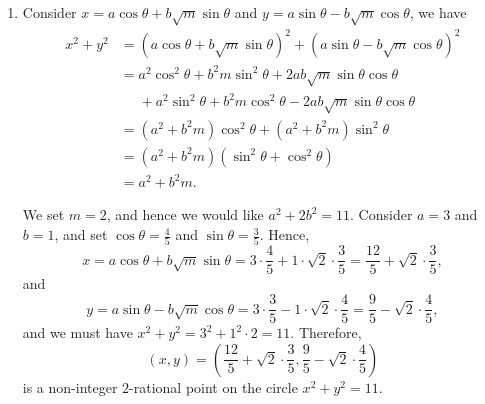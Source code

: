 \begin{enumerate}
\begin{enumerate}
              \item Consider \(x = a \cos \theta + b \sqrt{m} \sin \theta\) and \(y = a \sin \theta - b \sqrt{m} \cos \theta\), we have
                    \begin{align*}
                        x^2 + y^2 & = \left(a \cos \theta + b \sqrt{m} \sin \theta\right)^2 + \left(a \sin \theta - b \sqrt{m} \cos \theta\right)^2 \\
                                  & = a^2 \cos^2\theta + b^2 m \sin^2\theta + 2ab\sqrt{m} \sin\theta \cos\theta                                     \\
                                  & \phantom{=} + a^2 \sin^2\theta + b^2 m \cos^2\theta - 2ab\sqrt{m} \sin\theta \cos\theta                         \\
                                  & = (a^2 + b^2 m) \cos^2\theta + (a^2 + b^2 m) \sin^2\theta                                                       \\
                                  & = (a^2 + b^2 m) (\sin^2\theta + \cos^2\theta)                                                                   \\
                                  & = a^2 + b^2 m.
                    \end{align*}

                    We set \(m = 2\), and hence we would like \(a^2 + 2 b^2 = 11\). Consider \(a = 3\) and \(b = 1\), and set \(\cos \theta = \frac{4}{5}\) and \(\sin \theta = \frac{3}{5}\). Hence,
                    \[
                        x = a \cos \theta + b \sqrt{m} \sin \theta = 3 \cdot \frac{4}{5} + 1 \cdot \sqrt{2} \cdot \frac{3}{5} = \frac{12}{5} + \sqrt{2} \cdot \frac{3}{5},
                    \]
                    and
                    \[
                        y = a \sin \theta - b \sqrt{m} \cos \theta = 3 \cdot \frac{3}{5} - 1 \cdot \sqrt{2} \cdot \frac{4}{5} = \frac{9}{5} - \sqrt{2} \cdot \frac{4}{5},
                    \]
                    and we must have \(x^2 + y^2 = 3^2 + 1^2 \cdot 2 = 11\). Therefore,
                    \[
                        (x, y) = \left(\frac{12}{5} + \sqrt{2} \cdot \frac{3}{5}, \frac{9}{5} - \sqrt{2} \cdot \frac{4}{5}\right)
                    \]
                    is a non-integer \(2\)-rational point on the circle \(x^2 + y^2 = 11\).


\end{enumerate}
\end{enumerate}
